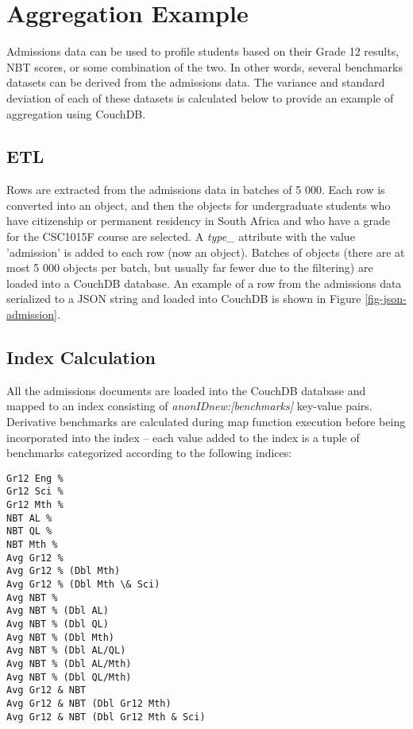 \section{Aggregation Example}
\label{aggregation}
Admissions data can be used to profile students based on their Grade 12 results, NBT scores, or some combination of the two. In other words, several benchmarks datasets can be derived from the admissions data. The variance and standard deviation of each of these datasets is calculated below to provide an example of aggregation using CouchDB.

\subsection{ETL}
Rows are extracted from the admissions data in batches of 5 000. Each row is converted into an object, and then the objects for undergraduate students who have citizenship or permanent residency in South Africa and who have a grade for the CSC1015F course are selected. A \textit{type\_} attribute with the value 'admission' is added to each row (now an object). Batches of objects (there are at most 5 000 objects per batch, but usually far fewer due to the filtering) are loaded into a CouchDB database. An example of a row from the admissions data serialized to a JSON string and loaded into CouchDB is shown in Figure \ref{fig-json-admission}.



\subsection{Index Calculation}
All the admissions documents are loaded into the CouchDB database and mapped to an index consisting of \textit{anonIDnew:[benchmarks]} key-value pairs. Derivative benchmarks are calculated during map function execution before being incorporated into the index – each value added to the index is a tuple of benchmarks categorized according to the following indices:

\begin{verbatim}
Gr12 Eng % 
Gr12 Sci % 
Gr12 Mth % 
NBT AL % 
NBT QL % 
NBT Mth % 
Avg Gr12 % 
Avg Gr12 % (Dbl Mth)
Avg Gr12 % (Dbl Mth \& Sci)
Avg NBT % 
Avg NBT % (Dbl AL)
Avg NBT % (Dbl QL)
Avg NBT % (Dbl Mth)
Avg NBT % (Dbl AL/QL)
Avg NBT % (Dbl AL/Mth)
Avg NBT % (Dbl QL/Mth)
Avg Gr12 & NBT 
Avg Gr12 & NBT (Dbl Gr12 Mth)
Avg Gr12 & NBT (Dbl Gr12 Mth & Sci)
\end{verbatim}

